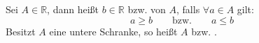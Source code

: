 Sei $A \in \mathbb{R}$, dann heißt $b \in \mathbb{R}$  bzw.  von $A$, falls $\forall a \in A$ gilt:
$$a \geq b \qquad \text{bzw.} \qquad a \leq b$$
Besitzt $A$ eine untere Schranke, so heißt $A$  bzw. .